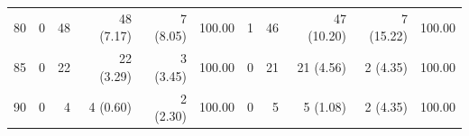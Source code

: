 \begin{table}
\begin{tabular}{r rrrrr rrrrr}
80 & 0 & 48 & 48 (7.17) & 7 (8.05) & 100.00 & 1 & 46 & 47 (10.20) & 7 (15.22) & 100.00\\
85 & 0 & 22 & 22 (3.29) & 3 (3.45) & 100.00 & 0 & 21 & 21 (4.56) & 2 (4.35) & 100.00\\
90 & 0 & 4 & 4 (0.60) & 2 (2.30) & 100.00 & 0 & 5 & 5 (1.08) & 2 (4.35) & 100.00\\


\bottomrule
\end{tabular}
\end{table}
